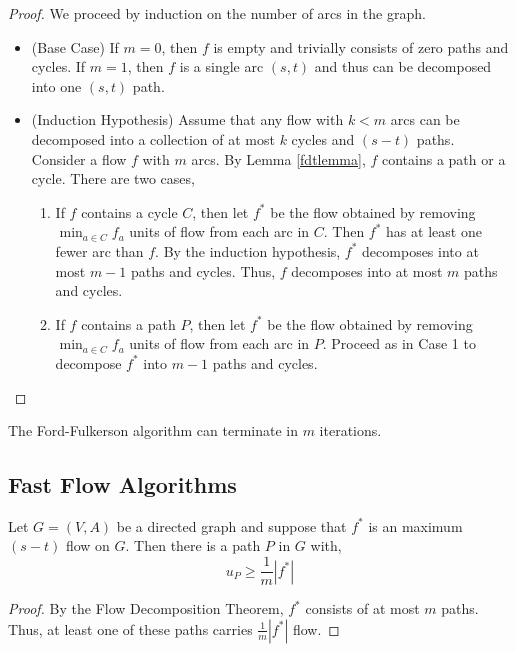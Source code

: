 	\begin{proof}
		We proceed by induction on the number of arcs in the graph.
		\begin{itemize}
			\item (Base Case) If $m = 0$, then $f$ is empty and trivially consists of zero paths and cycles. If $m = 1$, then $f$ is a single arc $(s,t)$ and thus can be decomposed into one $(s,t)$ path.
			\item (Induction Hypothesis) Assume that any flow with $k < m$ arcs can be decomposed into a collection of at most $k$ cycles and $(s-t)$ paths. Consider a flow $f$ with $m$ arcs. By Lemma \ref{fdtlemma}, $f$ contains a path or a cycle. There are two cases,
			\begin{enumerate}
				\item If $f$ contains a cycle $C$, then let $f^*$ be the flow obtained by removing $\min_{a \in C}f_a$ units of flow from each arc in $C$. Then $f^*$ has at least one fewer arc than $f$. By the induction hypothesis, $f^*$ decomposes into at most $m-1$ paths and cycles. Thus, $f$ decomposes into at most $m$ paths and cycles.
				\item If $f$ contains a path $P$, then let $f^*$ be the flow obtained by removing $\min_{a \in C}f_a$ units of flow from each arc in $P$. Proceed as in Case 1 to decompose $f^*$ into $m-1$ paths and cycles.
			\end{enumerate}
		\end{itemize}		
	\end{proof}

	\begin{cor}
		The Ford-Fulkerson algorithm can terminate in $m$ iterations.
	\end{cor}

	\subsection{Fast Flow Algorithms}
	\begin{rmk}
		Let $G = (V, A)$ be a directed graph and suppose that $f^*$ is an maximum $(s-t)$ flow on $G$. Then there is a path $P$ in $G$ with,
		\[u_P \geq \frac{1}{m}|f^*|\]
	\end{rmk}

	\begin{proof}
		By the Flow Decomposition Theorem, $f^*$ consists of at most $m$ paths. Thus, at least one of these paths carries $\frac{1}{m}|f^*|$ flow.
	\end{proof}

